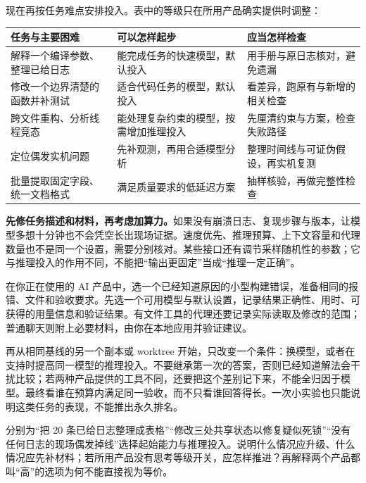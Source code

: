 现在再按任务难点安排投入。表中的等级只在所用产品确实提供时调整：
\begin{center}
\begin{tabular}{p{}p{}p{}}
\toprule
任务与主要困难 & 可以怎样起步 & 应当怎样检查 \\
\midrule
解释一个编译参数、整理已给日志 & 能完成任务的快速模型，默认投入 & 用手册与原日志核对，避免遗漏 \\
修改一个边界清楚的函数并补测试 & 适合代码任务的模型，默认投入 & 看差异，跑原有与新增的相关检查 \\
跨文件重构、分析线程竞态 & 能处理复杂约束的模型，按需增加推理投入 & 先厘清约束与方案，检查失败路径 \\
定位偶发实机问题 & 先补观测，再用合适模型分析 & 整理时间线与可证伪假设，再实机复测 \\
批量提取固定字段、统一文档格式 & 满足质量要求的低延迟方案 & 抽样核验，再做完整性检查 \\
\bottomrule
\end{tabular}
\end{center}
\textbf{先修任务描述和材料，再考虑加算力。}如果没有崩溃日志、复现步骤与版本，让模型多想十分钟也不会凭空长出现场证据。速度优先、推理预算、上下文容量和代理数量也不是同一个设置，需要分别核对。某些接口还有调节采样随机性的参数；它与推理投入的作用不同，不能把“输出更固定”当成“推理一定正确”。

\begin{example}[用一个熟悉的小任务比较设置]
在你正在使用的 AI 产品中，选一个已经知道原因的小型构建错误，准备相同的报错、文件和验收要求。先选一个可用模型与默认设置，记录结果正确性、用时、可获得的用量信息和验证结果。有文件工具的代理还要记录实际读取及修改的范围；普通聊天则附上必要材料，由你在本地应用并验证建议。

再从相同基线的另一个副本或 worktree 开始，只改变一个条件：换模型，或者在支持时提高同一模型的推理投入。不要继承第一次的答案，否则已经知道解法会干扰比较；若两种产品提供的工具不同，还要把这个差别记下来，不能全归因于模型。最终看谁在预算内满足同一验收，而不只看谁回答得长。一次小实验也只能说明这类任务的表现，不能推出永久排名。
\end{example}

\begin{exercise}\label{ex:ai-principle-selection}
分别为“把 20 条已给日志整理成表格”“修改三处共享状态以修复疑似死锁”“没有任何日志的现场偶发掉线”选择起始能力与推理投入。说明什么情况应升级、什么情况应先补材料；若所用产品没有思考等级开关，应怎样推进？再解释两个产品都叫“高”的选项为何不能直接视为等价。
\end{exercise}

